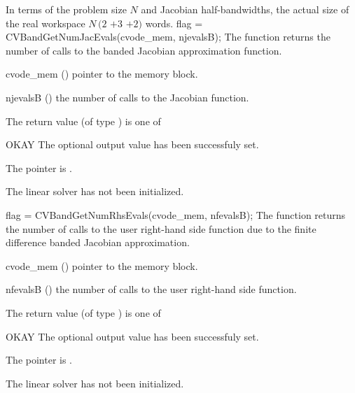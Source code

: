 {
  In terms of the problem size $N$ and Jacobian half-bandwidths, 
  the actual size of the real workspace
  $N\,(2$ $+ 3$  $+ 2)$  words.
}
{
  flag = CVBandGetNumJacEvals(cvode\_mem, njevalsB);
}
{
  The function  returns the
  number of calls to the banded Jacobian approximation function.
}
{
  \begin{args}
  \item[cvode\_mem] ()
    pointer to the {\cvodes} memory block.
  \item[njevalsB] ()
    the number of calls to the Jacobian function.
  \end{args}
}
{
  The return value  (of type ) is one of
  \begin{args}
  \item[OKAY] 
    The optional output value has been successfuly set.
  \item[\Id{LIN\_NO\_MEM}]
    The  pointer is .
  \item[\Id{LIN\_NO\_LMEM}]
    The {\cvband} linear solver has not been initialized.
  \end{args}
}
{}
{
  flag = CVBandGetNumRhsEvals(cvode\_mem, nfevalsB);
}
{
  The function  returns the
  number of calls to the user right-hand side function due to the 
  finite difference banded Jacobian approximation.
}
{
  \begin{args}
  \item[cvode\_mem] ()
    pointer to the {\cvodes} memory block.
  \item[nfevalsB] ()
    the number of calls to the user right-hand side function.
  \end{args}
}
{
  The return value  (of type ) is one of
  \begin{args}
  \item[OKAY] 
    The optional output value has been successfuly set.
  \item[\Id{LIN\_NO\_MEM}]
    The  pointer is .
  \item[\Id{LIN\_NO\_LMEM}]
    The {\cvband} linear solver has not been initialized.
  \end{args}
}
